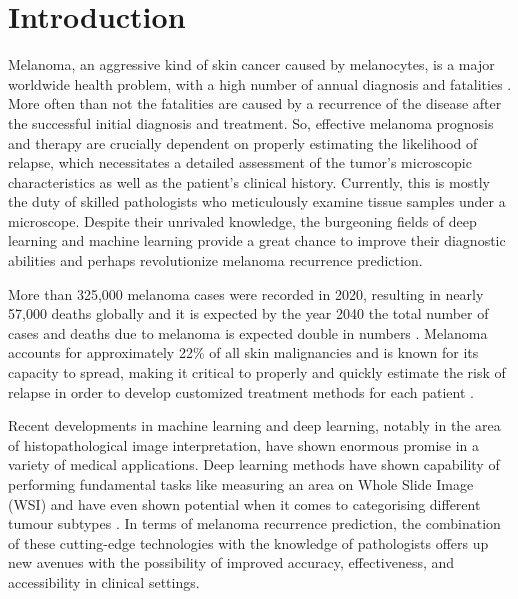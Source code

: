 \documentclass[conference]{IEEEtran}
\begin{document}
\section{Introduction}
Melanoma, an aggressive kind of skin cancer caused by melanocytes, is a major worldwide health problem, with a high number of annual diagnosis and fatalities \cite{b1}.
More often than not the fatalities are caused by a recurrence of the disease after the successful initial diagnosis and treatment. So, effective melanoma prognosis and therapy are crucially dependent on properly estimating the likelihood of relapse, which necessitates a detailed assessment of the tumor's microscopic characteristics as well as the patient's clinical history. Currently, this is mostly the duty of skilled pathologists who meticulously examine tissue samples under a microscope. Despite their unrivaled knowledge, the burgeoning fields of deep learning and machine learning provide a great chance to improve their diagnostic abilities and perhaps revolutionize melanoma recurrence prediction.

More than 325,000 melanoma cases were recorded in 2020, resulting in nearly 57,000 deaths globally and it is expected by the year 2040 the total number of cases and deaths due to melanoma is expected double in numbers \cite{b1}. Melanoma accounts for approximately 22\% of all skin malignancies and is known for its capacity to spread, making it critical to properly and quickly estimate the risk of relapse in order to develop customized treatment methods for each patient \cite{b1}. 

%   

Recent developments in machine learning and deep learning, notably in the area of histopathological image interpretation, have shown enormous promise in a variety of medical applications. Deep learning methods have shown capability of performing fundamental tasks like measuring an area on Whole Slide Image (WSI) and have even shown potential when it comes to categorising different tumour subtypes \cite{b2, b3, b4}. In terms of melanoma recurrence prediction, the combination of these cutting-edge technologies with the knowledge of pathologists offers up new avenues with the possibility of improved accuracy, effectiveness, and accessibility in clinical settings.
\end{document}
